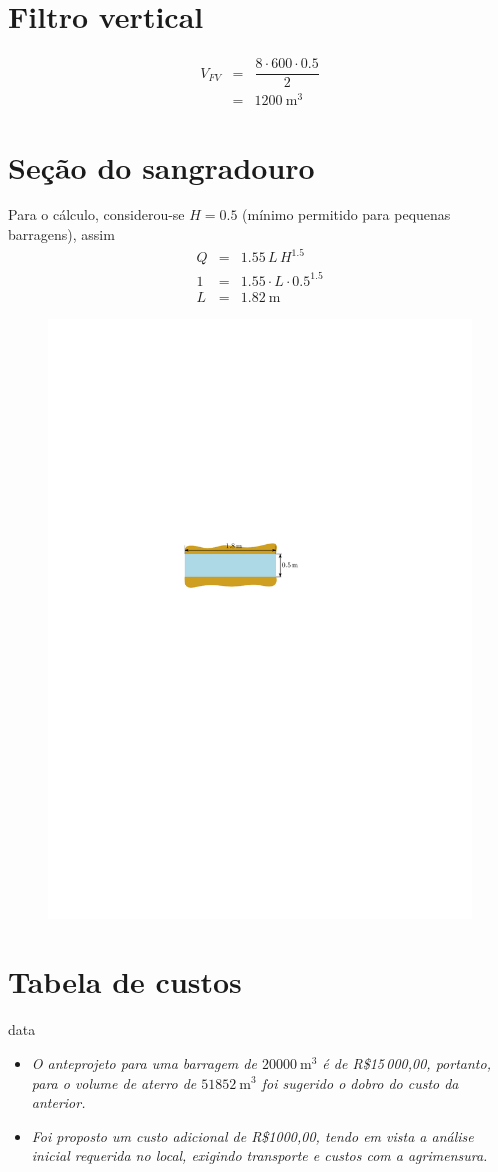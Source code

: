 \documentclass[a4paper, 12pt, brazilian]{article}
\begin{document}
	\section{Filtro vertical}
	\begin{eqnarray}
		V_{FV}&=&\dfrac{8\cdot 600\cdot 0.5}{2}\\
		&=&\SI{1200}{\meter^{3}}
	\end{eqnarray}
	
	\section{Seção do sangradouro}
	
	Para o cálculo, considerou-se $H=0.5$ (mínimo permitido para pequenas barragens), assim
	\begin{eqnarray}
		Q&=&1.55\,L\,H^{1.5}\\
		1&=&1.55\cdot L\cdot 0.5^{1.5}\\
		L&=&\SI{1.82}{\meter}
	\end{eqnarray}
	
	\begin{figure}[H]
		\centering
		\includegraphics[width=0.5\linewidth]{images/sang}
		\label{fig:sang}
	\end{figure}
	
	\newpage
	\section{Tabela de custos}
	
	{data}
	
	\begin{small}
		\begin{itemize}
			\item\textit{O anteprojeto para uma barragem de $\SI{20000}{\meter^{3}}$ é de \textrm{R\$15\,000,00}, portanto, para o volume de aterro de $\SI{51852}{\meter^{3}}$ foi sugerido o dobro do custo da anterior.}
			\item\textit{Foi proposto um custo adicional de R\$1000,00, tendo em vista a análise inicial requerida no local, exigindo transporte e custos com a agrimensura.}
		\end{itemize}
	\end{small}
	
\end{document}
